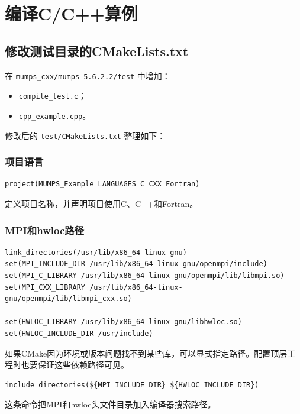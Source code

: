 \section{编译C/C++算例}

\subsection{修改测试目录的CMakeLists.txt}

在 \texttt{mumps\_cxx/mumps-5.6.2.2/test} 中增加：

\begin{itemize}
  \item \texttt{compile\_test.c}；
  \item \texttt{cpp\_example.cpp}。
\end{itemize}

修改后的 \texttt{test/CMakeLists.txt} 整理如下：

\subsubsection{项目语言}

\begin{lstlisting}
project(MUMPS_Example LANGUAGES C CXX Fortran)
\end{lstlisting}

定义项目名称，并声明项目使用C、C++和Fortran。

\subsubsection{MPI和hwloc路径}

\begin{lstlisting}
link_directories(/usr/lib/x86_64-linux-gnu)
set(MPI_INCLUDE_DIR /usr/lib/x86_64-linux-gnu/openmpi/include)
set(MPI_C_LIBRARY /usr/lib/x86_64-linux-gnu/openmpi/lib/libmpi.so)
set(MPI_CXX_LIBRARY /usr/lib/x86_64-linux-gnu/openmpi/lib/libmpi_cxx.so)

set(HWLOC_LIBRARY /usr/lib/x86_64-linux-gnu/libhwloc.so)
set(HWLOC_INCLUDE_DIR /usr/include)
\end{lstlisting}

如果CMake因为环境或版本问题找不到某些库，可以显式指定路径。配置顶层工程时也要保证这些依赖路径可见。

\begin{lstlisting}
include_directories(${MPI_INCLUDE_DIR} ${HWLOC_INCLUDE_DIR})
\end{lstlisting}

这条命令把MPI和hwloc头文件目录加入编译器搜索路径。

